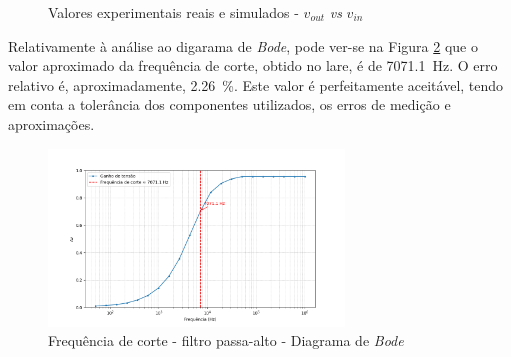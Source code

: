 \begin{figure}[hbtp]
	\centering%
		\centering
		\qquad
		\caption{Valores experimentais reais e simulados - $v_{out}$ \textit{vs} $v_{in}$}%
		\label{fig:simulacaoPA}%
	\end{figure}

Relativamente à análise ao digarama de \textit{Bode}, pode ver-se na Figura \ref{fig:fcBode} que o valor aproximado da frequência de corte, obtido no \acrshort{lare}, é de \SI{7071.1}{\hertz}. O erro relativo é, aproximadamente, \SI{2.26}{\percent}. Este valor é perfeitamente aceitável, tendo em conta a tolerância dos componentes utilizados, os erros de medição e aproximações.

\begin{figure}[hbtp]
	\centering
	\includegraphics[width=0.7\textwidth]{figures/bode_hpf_fc.png}
	\caption{Frequência de corte - filtro passa-alto - Diagrama de \textit{Bode}}
	\label{fig:fcBode}
\end{figure}

